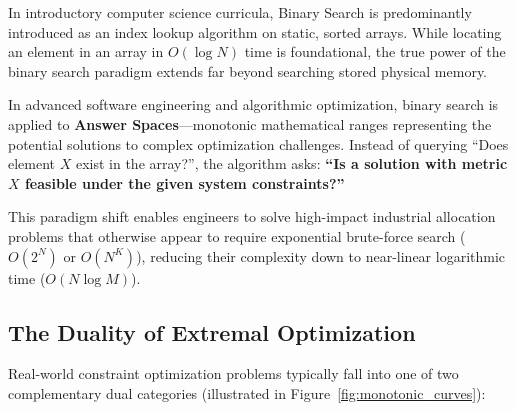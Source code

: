 \documentclass[10pt,journal,compsoc,onecolumn]{IEEEtran}
\begin{document}
In introductory computer science curricula, Binary Search is predominantly introduced as an index lookup algorithm on static, sorted arrays. While locating an element in an array in $O(\log N)$ time is foundational, the true power of the binary search paradigm extends far beyond searching stored physical memory. 

In advanced software engineering and algorithmic optimization, binary search is applied to \textbf{Answer Spaces}—monotonic mathematical ranges representing the potential solutions to complex optimization challenges. Instead of querying ``Does element $X$ exist in the array?'', the algorithm asks: \textbf{``Is a solution with metric $X$ feasible under the given system constraints?''}

This paradigm shift enables engineers to solve high-impact industrial allocation problems that otherwise appear to require exponential brute-force search ($O(2^N)$ or $O(N^K)$), reducing their complexity down to near-linear logarithmic time ($O(N \log M)$).

\subsection{The Duality of Extremal Optimization}

Real-world constraint optimization problems typically fall into one of two complementary dual categories (illustrated in Figure~\ref{fig:monotonic_curves}):
\end{document}
